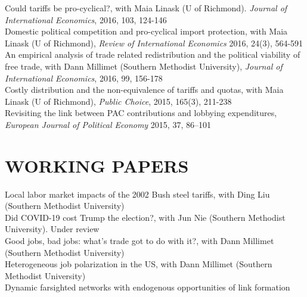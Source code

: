 \documentclass[11pt]{res}
\begin{document}
\begin{resume}
{Could tariffs be pro-cyclical?}, with Maia Linask (U of Richmond). \emph{Journal of International Economics}, 2016, 103, 124-146 \vspace{1.5mm}\\
{Domestic political competition and pro-cyclical import protection}, with Maia Linask (U of Richmond), \emph{Review of International Economics} 2016, 24(3), 564-591\vspace{1.5mm}\\
{An empirical analysis of trade related redistribution and the political viability of free trade}, with Dann Millimet (Southern Methodist University), \emph{Journal of International Economics}, 2016, 99, 156-178 \vspace{1.5mm}\\
{Costly distribution and the non-equivalence of tariffs and quotas}, with Maia Linask (U of Richmond), \emph{Public Choice}, 2015, 165(3), 211-238 \vspace{1.5mm}\\
{Revisiting the link between PAC contributions and lobbying expenditures, \emph{European Journal of Political Economy}} 2015, 37, 86--101

\section{WORKING PAPERS}\vspace{1.5mm}
Local labor market impacts of the 2002 Bush steel tariffs, with Ding Liu (Southern Methodist University)\vspace{1.5mm}\\
{Did COVID-19 cost Trump the election?}, with Jun Nie (Southern Methodist University). Under review\vspace{1.5mm}\\
{Good jobs, bad jobs: what's trade got to do with it?}, with Dann Millimet (Southern Methodist University)\vspace{1.5mm}\\
{Heterogeneous job polarization in the US}, with Dann Millimet (Southern Methodist University)\vspace{1.5mm}\\
{Dynamic farsighted networks with endogenous opportunities of link formation}


\end{resume}
\end{document}
